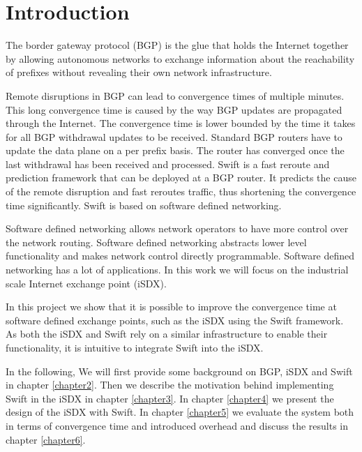 

\chapter{\label{introduction}Introduction}
The border gateway protocol (BGP) is the glue that holds the Internet together by allowing 
autonomous networks to exchange information about the reachability of prefixes without revealing their own network infrastructure. 

Remote disruptions in BGP can lead to convergence times of multiple minutes. This long convergence time is caused by the way BGP updates are propagated through the Internet. The convergence time is lower bounded by the time it takes for all BGP withdrawal updates to be received. Standard BGP routers have to update the data plane on a per prefix basis. The router has converged once the last withdrawal has been received and processed. Swift is a fast reroute and prediction framework that can be deployed at a BGP router. It predicts the cause of the remote disruption and fast reroutes traffic, thus shortening the convergence time significantly. Swift is based on software defined networking. 

Software defined networking allows network operators to have more control over the network routing. Software defined networking abstracts lower level functionality and makes network control directly programmable. Software defined networking has a lot of applications. In this work we will focus on the industrial scale Internet exchange point (iSDX). 

In this project we show that it is possible to improve the convergence time at software defined exchange points, such as the iSDX using the Swift framework. As both the iSDX and Swift rely on a similar infrastructure to enable their functionality, it is intuitive to integrate Swift into the iSDX. 

In the following, We will first provide some background on BGP, iSDX and Swift in chapter \ref{chapter2}. Then we describe the motivation behind implementing Swift in the iSDX in chapter \ref{chapter3}. In chapter \ref{chapter4} we present the design of the iSDX with Swift. In chapter \ref{chapter5} we evaluate the system both in terms of convergence time and introduced overhead and discuss the results in chapter \ref{chapter6}. 



